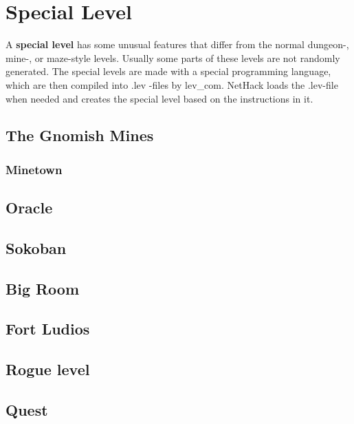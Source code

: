 \part{Special Level}
A \textbf{special level} has some unusual features that differ from the normal dungeon-{}, mine-{}, or maze-{}style levels. Usually some parts of these levels are not randomly generated. The special levels are made with a special programming language, which are then compiled into .lev -{}files by lev\_com. NetHack loads the .lev-{}file when needed and creates the special level based on the instructions in it.

\chapter{The Gnomish Mines}
\section{Minetown}

\chapter{Oracle}
\chapter{Sokoban}
\chapter{Big Room}
\chapter{Fort Ludios}
\chapter{Rogue level}
\chapter{Quest}
